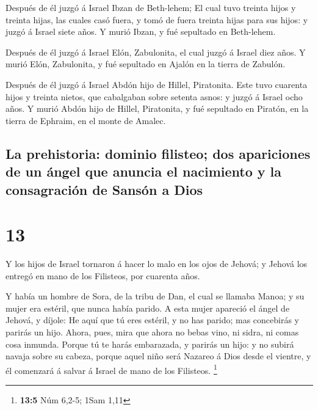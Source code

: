  Después de él juzgó á Israel Ibzan de Beth-lehem;
 El cual tuvo treinta hijos y treinta hijas, las cuales casó
fuera, y tomó de fuera treinta hijas para sus hijos: y juzgó á Israel
siete años.  Y murió Ibzan, y fué sepultado en Beth-lehem.

 Después de él juzgó á Israel Elón, Zabulonita, el cual
juzgó á Israel diez años.  Y murió Elón, Zabulonita, y fué
sepultado en Ajalón en la tierra de Zabulón.

 Después de él juzgó á Israel Abdón hijo de Hillel,
Piratonita.  Este tuvo cuarenta hijos y treinta nietos, que
cabalgaban sobre setenta asnos: y juzgó á Israel ocho años.
 Y murió Abdón hijo de Hillel, Piratonita, y fué sepultado
en Piratón, en la tierra de Ephraim, en el monte de Amalec.

\hypertarget{la-prehistoria-dominio-filisteo-dos-apariciones-de-un-uxe1ngel-que-anuncia-el-nacimiento-y-la-consagraciuxf3n-de-sansuxf3n-a-dios}{%
\subsection{La prehistoria: dominio filisteo; dos apariciones de un
ángel que anuncia el nacimiento y la consagración de Sansón a
Dios}\label{la-prehistoria-dominio-filisteo-dos-apariciones-de-un-uxe1ngel-que-anuncia-el-nacimiento-y-la-consagraciuxf3n-de-sansuxf3n-a-dios}}

\hypertarget{section-12}{%
\section{13}\label{section-12}}

 Y los hijos de Israel tornaron á hacer lo malo en los ojos
de Jehová; y Jehová los entregó en mano de los Filisteos, por cuarenta
años.

 Y había un hombre de Sora, de la tribu de Dan, el cual se
llamaba Manoa; y su mujer era estéril, que nunca había parido.
 A esta mujer apareció el ángel de Jehová, y díjole: He aquí
que tú eres estéril, y no has parido; mas concebirás y parirás un hijo.
 Ahora, pues, mira que ahora no bebas vino, ni sidra, ni
comas cosa inmunda.  Porque tú te harás embarazada, y
parirás un hijo: y no subirá navaja sobre su cabeza, porque aquel niño
será Nazareo á Dios desde el vientre, y él comenzará á salvar á Israel
de mano de los Filisteos. \footnote{\textbf{13:5} Núm 6,2-5; 1Sam 1,11}

